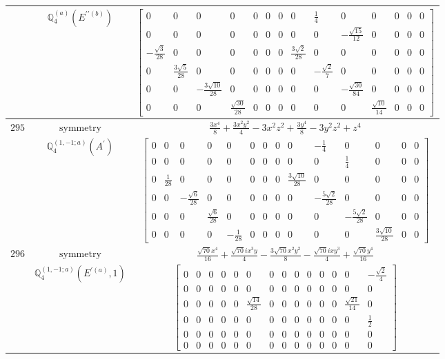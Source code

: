 \documentclass[fleqn,8pt,landscape]{jsarticle}
\begin{document}
\begin{longtable}{ccc}
$  $ & $ \mathbb{Q}_{4}^{(a)}(E^{\prime\prime(b)}) $ & $ \begin{bmatrix} 0 & 0 & 0 & 0 & 0 & 0 & 0 & 0 & \frac{1}{4} & 0 & 0 & 0 & 0 & 0 \\ 0 & 0 & 0 & 0 & 0 & 0 & 0 & 0 & 0 & - \frac{\sqrt{15}}{12} & 0 & 0 & 0 & 0 \\ - \frac{\sqrt{3}}{28} & 0 & 0 & 0 & 0 & 0 & 0 & \frac{3 \sqrt{2}}{28} & 0 & 0 & 0 & 0 & 0 & 0 \\ 0 & \frac{3 \sqrt{5}}{28} & 0 & 0 & 0 & 0 & 0 & 0 & - \frac{\sqrt{2}}{7} & 0 & 0 & 0 & 0 & 0 \\ 0 & 0 & - \frac{3 \sqrt{10}}{28} & 0 & 0 & 0 & 0 & 0 & 0 & - \frac{\sqrt{30}}{84} & 0 & 0 & 0 & 0 \\ 0 & 0 & 0 & \frac{\sqrt{30}}{28} & 0 & 0 & 0 & 0 & 0 & 0 & \frac{\sqrt{10}}{14} & 0 & 0 & 0 \end{bmatrix} $ \\ \hline
$ 295 $ & $ \text{symmetry} $ & $ \frac{3 x^{4}}{8} + \frac{3 x^{2} y^{2}}{4} - 3 x^{2} z^{2} + \frac{3 y^{4}}{8} - 3 y^{2} z^{2} + z^{4} $ \\
$  $ & $ \mathbb{Q}_{4}^{(1,-1;a)}(A^{\prime}) $ & $ \begin{bmatrix} 0 & 0 & 0 & 0 & 0 & 0 & 0 & 0 & 0 & - \frac{1}{4} & 0 & 0 & 0 & 0 \\ 0 & 0 & 0 & 0 & 0 & 0 & 0 & 0 & 0 & 0 & \frac{1}{4} & 0 & 0 & 0 \\ 0 & \frac{1}{28} & 0 & 0 & 0 & 0 & 0 & 0 & \frac{3 \sqrt{10}}{28} & 0 & 0 & 0 & 0 & 0 \\ 0 & 0 & - \frac{\sqrt{6}}{28} & 0 & 0 & 0 & 0 & 0 & 0 & - \frac{5 \sqrt{2}}{28} & 0 & 0 & 0 & 0 \\ 0 & 0 & 0 & \frac{\sqrt{6}}{28} & 0 & 0 & 0 & 0 & 0 & 0 & - \frac{5 \sqrt{2}}{28} & 0 & 0 & 0 \\ 0 & 0 & 0 & 0 & - \frac{1}{28} & 0 & 0 & 0 & 0 & 0 & 0 & \frac{3 \sqrt{10}}{28} & 0 & 0 \end{bmatrix} $ \\ \hline
$ 296 $ & $ \text{symmetry} $ & $ \frac{\sqrt{70} x^{4}}{16} + \frac{\sqrt{70} i x^{3} y}{4} - \frac{3 \sqrt{70} x^{2} y^{2}}{8} - \frac{\sqrt{70} i x y^{3}}{4} + \frac{\sqrt{70} y^{4}}{16} $ \\
$  $ & $ \mathbb{Q}_{4}^{(1,-1;a)}(E^{\prime(a)},1) $ & $ \begin{bmatrix} 0 & 0 & 0 & 0 & 0 & 0 & 0 & 0 & 0 & 0 & 0 & 0 & 0 & - \frac{\sqrt{2}}{4} \\ 0 & 0 & 0 & 0 & 0 & 0 & 0 & 0 & 0 & 0 & 0 & 0 & 0 & 0 \\ 0 & 0 & 0 & 0 & 0 & \frac{\sqrt{14}}{28} & 0 & 0 & 0 & 0 & 0 & 0 & \frac{\sqrt{21}}{14} & 0 \\ 0 & 0 & 0 & 0 & 0 & 0 & 0 & 0 & 0 & 0 & 0 & 0 & 0 & \frac{1}{2} \\ 0 & 0 & 0 & 0 & 0 & 0 & 0 & 0 & 0 & 0 & 0 & 0 & 0 & 0 \\ 0 & 0 & 0 & 0 & 0 & 0 & 0 & 0 & 0 & 0 & 0 & 0 & 0 & 0 \end{bmatrix} $ \\ \hline

\end{longtable}
\end{document}
